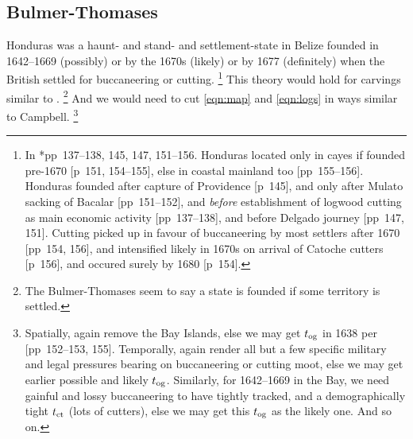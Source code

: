 	\subsection{Bulmer-Thomases}
	\label{ss:thomases}
		Honduras was a haunt- and stand- and settlement-state in Belize founded in 1642--1669 (possibly) or by the 1670s (likely) or by 1677 (definitely) when the British settled for buccaneering or cutting.%
		\footnote{In \cite{bul16}*{pp~137--138, 145, 147, 151--156}. Honduras located only in cayes if founded pre-1670 [p~151, 154--155], else in coastal mainland too [pp~155--156]. Honduras founded after capture of Providence [p~145], and only after Mulato sacking of Bacalar [pp~151--152], and \emph{before} establishment of logwood cutting as main economic activity [pp~137--138], and before Delgado journey [pp~147, 151]. Cutting picked up in favour of buccaneering by most settlers after 1670 [pp~154, 156], and intensified likely in 1670s on arrival of Catoche cutters [p~156], and occured surely by 1680 [p~154].}
		This theory would hold for carvings similar to .%
		\footnote{The Bulmer-Thomases seem to say a state is founded if some territory is settled.} %
		And we would need to cut \ref{eqn:map} and \ref{eqn:logs} in ways similar to Campbell.%
		\footnote{Spatially, again remove the Bay Islands, else we may get \(t_{\operatorname{og}}\) in 1638 per [pp~152--153, 155]. Temporally, again render all but a few specific military and legal pressures bearing on buccaneering or cutting moot, else we may get earlier possible and likely \(t_{\operatorname{og}}\). Similarly, for 1642--1669 in the Bay, we need gainful and lossy buccaneering to have tightly tracked, and a demographically tight \(t_{\operatorname{ct}}\) (lots of cutters), else we may get this \(t_{\operatorname{og}}\) as the likely one. And so on.} %
